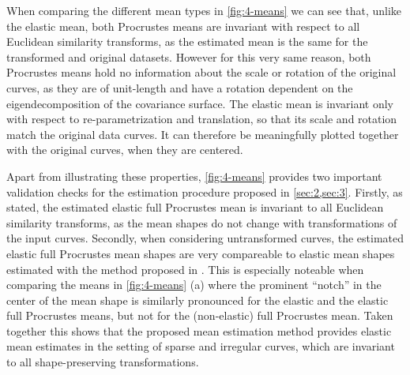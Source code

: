 When comparing the different mean types in \cref{fig:4-means} we can see that, unlike the elastic mean, both Procrustes means are invariant with respect to all Euclidean similarity transforms, as the estimated mean is the same for the transformed and original datasets.
However for this very same reason, both Procrustes means hold no information about the scale or rotation of the original curves, as they are of unit-length and have a rotation dependent on the eigendecomposition of the covariance surface.
The elastic mean is invariant only with respect to re-parametrization and translation, so that its scale and rotation match the original data curves.
It can therefore be meaningfully plotted together with the original curves, when they are centered.

Apart from illustrating these properties, \cref{fig:4-means} provides two important validation checks for the estimation procedure proposed in \cref{sec:2,sec:3}.
Firstly, as stated, the estimated elastic full Procrustes mean is invariant to all Euclidean similarity transforms, as the mean shapes do not change with transformations of the input curves.
Secondly, when considering untransformed curves, the estimated elastic full Procrustes mean shapes are very compareable to elastic mean shapes estimated with the method proposed in \cite{Steyer2021}.
This is especially noteable when comparing the means in \cref{fig:4-means} (a) where the prominent \enquote{notch} in the center of the mean shape is similarly pronounced for the elastic and the elastic full Procrustes means, but not for the (non-elastic) full Procrustes mean.
Taken together this shows that the proposed mean estimation method provides elastic mean estimates in the setting of sparse and irregular curves, which are invariant to all shape-preserving transformations.


